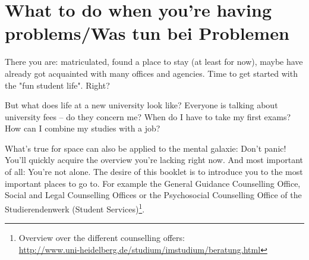 \section{What to do when you're having problems/Was tun bei Problemen}
\label{Jungle}
There you are: matriculated, found a place to stay (at least for now), maybe have already got acquainted with many offices and agencies. Time to get started with the "fun student life". Right?

But what does life at a new university look like? Everyone is talking about university fees -- do they concern me? When do I have to take my first exams? How can I combine my studies with a job?

What's true for space can also be applied to the mental galaxie: Don't panic! You'll quickly acquire the overview you're lacking right now. And most important of all: You're not alone. The desire of this booklet is to introduce you to the most important places to go to. For example the General Guidance Counselling Office, Social and Legal Counselling Offices or the Psychosocial Counselling Office of the Studierendenwerk (Student Services)\footnote{Overview over the different counselling offers:\\\url{http://www.uni-heidelberg.de/studium/imstudium/beratung.html}}.



